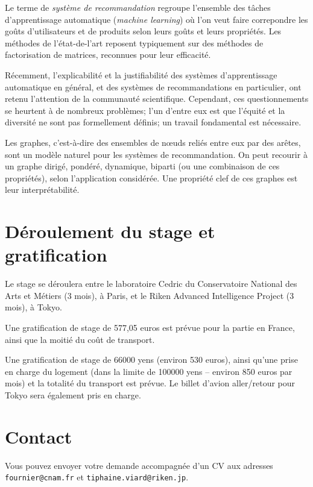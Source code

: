 \documentclass[a4paper, 11pt]{article}
\begin{document}
Le terme de {\em système de recommandation} regroupe l'ensemble des tâches d'apprentissage automatique ({\em machine learning}) où l'on veut faire correpondre les goûts d'utilisateurs et de produits selon leurs goûts et leurs propriétés. 
Les méthodes de l'état-de-l'art reposent typiquement sur des méthodes de factorisation de matrices, reconnues pour leur efficacité.

Récemment, l'explicabilité et la justifiabilité des systèmes d'apprentissage automatique en général, et des systèmes de recommandations en particulier, ont retenu l'attention de la communauté scientifique.
Cependant, ces questionnements se heurtent à de nombreux problèmes; l'un d'entre eux est que l'équité et la diversité ne sont pas formellement définis; un travail fondamental est nécessaire.

Les graphes, c'est-à-dire des ensembles de n\oe{}uds reliés entre eux par des arêtes, sont un modèle naturel pour les systèmes de recommandation.
On peut recourir à un graphe dirigé, pondéré, dynamique, biparti (ou une combinaison de ces propriétés), selon l'application considérée.
Une propriété clef de ces graphes est leur interprétabilité.

\section{Déroulement du stage et gratification}

Le stage se déroulera entre le laboratoire Cedric du Conservatoire National des Arts et Métiers (3 mois), à Paris, et le Riken Advanced Intelligence Project (3 mois), à Tokyo.

Une gratification de stage de 577,05 euros est prévue pour la partie en France, ainsi que la moitié du coût de transport.

Une gratification de stage de 66000 yens (environ 530 euros), ainsi qu'une prise en charge du logement (dans la limite de 100000 yens -- environ 850 euros par mois) et la totalité du transport est prévue. Le billet d'avion aller/retour pour Tokyo sera également pris en charge.

\section{Contact}

Vous pouvez envoyer votre demande accompagnée d'un CV aux adresses \texttt{fournier@cnam.fr} et \texttt{tiphaine.viard@riken.jp}.
\end{document}
